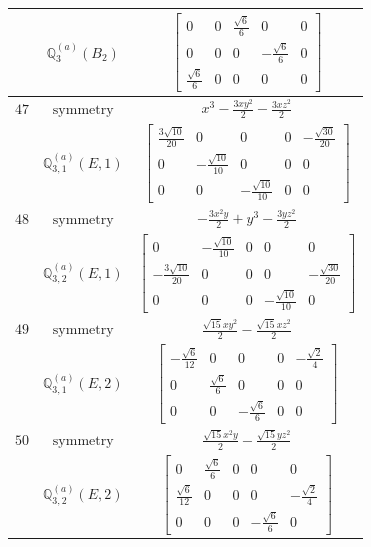\documentclass[fleqn,8pt,landscape]{jsarticle}
\begin{document}
\begin{longtable}{ccc}
$  $ & $ \mathbb{Q}_{3}^{(a)}(B_{2}) $ & $ \begin{bmatrix} 0 & 0 & \frac{\sqrt{6}}{6} & 0 & 0 \\ 0 & 0 & 0 & - \frac{\sqrt{6}}{6} & 0 \\ \frac{\sqrt{6}}{6} & 0 & 0 & 0 & 0 \end{bmatrix} $ \\ \hline
$ 47 $ & $ \text{symmetry} $ & $ x^{3} - \frac{3 x y^{2}}{2} - \frac{3 x z^{2}}{2} $ \\
$  $ & $ \mathbb{Q}_{3,1}^{(a)}(E,1) $ & $ \begin{bmatrix} \frac{3 \sqrt{10}}{20} & 0 & 0 & 0 & - \frac{\sqrt{30}}{20} \\ 0 & - \frac{\sqrt{10}}{10} & 0 & 0 & 0 \\ 0 & 0 & - \frac{\sqrt{10}}{10} & 0 & 0 \end{bmatrix} $ \\ \hline
$ 48 $ & $ \text{symmetry} $ & $ - \frac{3 x^{2} y}{2} + y^{3} - \frac{3 y z^{2}}{2} $ \\
$  $ & $ \mathbb{Q}_{3,2}^{(a)}(E,1) $ & $ \begin{bmatrix} 0 & - \frac{\sqrt{10}}{10} & 0 & 0 & 0 \\ - \frac{3 \sqrt{10}}{20} & 0 & 0 & 0 & - \frac{\sqrt{30}}{20} \\ 0 & 0 & 0 & - \frac{\sqrt{10}}{10} & 0 \end{bmatrix} $ \\ \hline
$ 49 $ & $ \text{symmetry} $ & $ \frac{\sqrt{15} x y^{2}}{2} - \frac{\sqrt{15} x z^{2}}{2} $ \\
$  $ & $ \mathbb{Q}_{3,1}^{(a)}(E,2) $ & $ \begin{bmatrix} - \frac{\sqrt{6}}{12} & 0 & 0 & 0 & - \frac{\sqrt{2}}{4} \\ 0 & \frac{\sqrt{6}}{6} & 0 & 0 & 0 \\ 0 & 0 & - \frac{\sqrt{6}}{6} & 0 & 0 \end{bmatrix} $ \\ \hline
$ 50 $ & $ \text{symmetry} $ & $ \frac{\sqrt{15} x^{2} y}{2} - \frac{\sqrt{15} y z^{2}}{2} $ \\
$  $ & $ \mathbb{Q}_{3,2}^{(a)}(E,2) $ & $ \begin{bmatrix} 0 & \frac{\sqrt{6}}{6} & 0 & 0 & 0 \\ \frac{\sqrt{6}}{12} & 0 & 0 & 0 & - \frac{\sqrt{2}}{4} \\ 0 & 0 & 0 & - \frac{\sqrt{6}}{6} & 0 \end{bmatrix} $ \\ \hline

\end{longtable}
\end{document}
